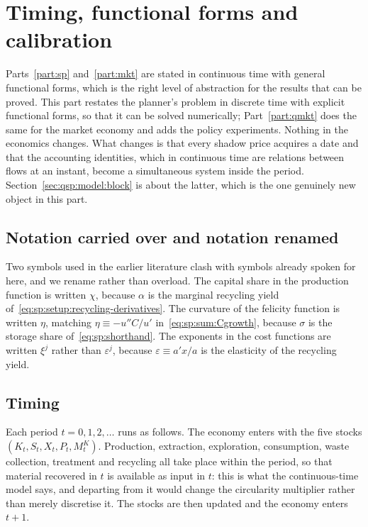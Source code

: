 \section{Timing, functional forms and calibration}\label{sec:qsp:setup}

Parts~\ref{part:sp} and~\ref{part:mkt} are stated in continuous time with general functional forms,
which is the right level of abstraction for the results that can be proved. This part restates the
planner's problem in discrete time with explicit functional forms, so that it can be solved
numerically; Part~\ref{part:qmkt} does the same for the market economy and adds the policy
experiments. Nothing in the economics changes. What changes is that every shadow price acquires a date
and that the accounting identities, which in continuous time are relations between flows at an instant,
become a simultaneous system inside the period. Section~\ref{sec:qsp:model:block} is about the latter,
which is the one genuinely new object in this part.

\subsection{Notation carried over and notation renamed}\label{sec:qsp:setup:notation}

Two symbols used in the earlier literature clash with symbols already spoken for here, and we rename
rather than overload. The capital share in the production function is written $\chi$, because $\alpha$
is the marginal recycling yield of~\eqref{eq:sp:setup:recycling-derivatives}. The curvature of the
felicity function is written $\eta$, matching $\eta\equiv-u''C/u'$ in~\eqref{eq:sp:sum:Cgrowth},
because $\sigma$ is the storage share of~\eqref{eq:sp:shorthand}. The exponents in the cost functions
are written $\xi^j$ rather than $\varepsilon^j$, because $\varepsilon\equiv a'x/a$ is the elasticity of
the recycling yield.

\subsection{Timing}\label{sec:qsp:setup:timing}

Each period $t=0,1,2,\dots$ runs as follows. The economy enters with the five stocks
$\left(K_t,S_t,X_t,P_t,M^K_t\right)$. Production, extraction, exploration, consumption, waste
collection, treatment and recycling all take place within the period, so that material recovered in
$t$ is available as input in $t$: this is what the continuous-time model says, and departing from it
would change the circularity multiplier rather than merely discretise it. The stocks are then updated
and the economy enters $t+1$.

